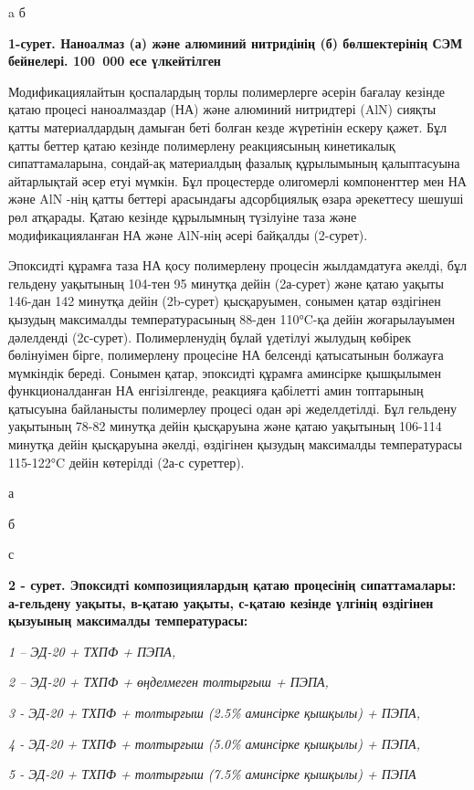 a б

{\bfseries 1-сурет. Наноалмаз (а) және алюминий нитридінің (б)
бөлшектерінің СЭМ бейнелері. 100~000 есе үлкейтілген}

Модификациялайтын қоспалардың торлы полимерлерге әсерін бағалау кезінде
қатаю процесі наноалмаздар (НА) және алюминий нитридтері (AlN) сияқты
қатты материалдардың дамыған беті болған кезде жүретінін ескеру қажет.
Бұл қатты беттер қатаю кезінде полимерлену реакциясының кинетикалық
сипаттамаларына, сондай-ақ материалдың фазалық құрылымының қалыптасуына
айтарлықтай әсер етуі мүмкін. Бұл процестерде олигомерлі компоненттер
мен НА және AlN -нің қатты беттері арасындағы адсорбциялық өзара
әрекеттесу шешуші рөл атқарады. Қатаю кезінде құрылымның түзілуіне таза
және модификацияланған НА және AlN-нің әсері байқалды (2-сурет).

Эпоксидті құрамға таза НА қосу полимерлену процесін жылдамдатуға әкелді,
бұл гельдену уақытының 104-тен 95 минутқа дейін (2а-сурет) және қатаю
уақыты 146-дан 142 минутқа дейін (2b-сурет) қысқаруымен, сонымен қатар
өздігінен қызудың максималды температурасының 88-ден 110°C-қа дейін
жоғарылауымен дәлелденді (2с-сурет). Полимерленудің бұлай үдетілуі
жылудың көбірек бөлінуімен бірге, полимерлену процесіне НА белсенді
қатысатынын болжауға мүмкіндік береді. Сонымен қатар, эпоксидті құрамға
аминсірке қышқылымен функционалданған НА енгізілгенде, реакцияға
қабілетті амин топтарының қатысуына байланысты полимерлеу процесі одан
әрі жеделдетілді. Бұл гельдену уақытының 78-82 минутқа дейін қысқаруына
және қатаю уақытының 106-114 минутқа дейін қысқаруына әкелді, өздігінен
қызудың максималды температурасы 115-122°C дейін көтерілді (2а-с
суреттер).

а

б

с

{\bfseries 2 - сурет. Эпоксидті композициялардың қатаю процесінің
сипаттамалары: а-гельдену уақыты, в-қатаю уақыты, с-қатаю кезінде
үлгінің өздігінен қызуының максималды температурасы:}

\emph{1 -- ЭД-20 + ТХПФ + ПЭПА,}

\emph{2 -- ЭД-20 + ТХПФ + өңделмеген толтырғыш + ПЭПА,}

\emph{3 - ЭД-20 + ТХПФ + толтырғыш (2.5\% аминсірке қышқылы) + ПЭПА,}

\emph{4 - ЭД-20 + ТХПФ + толтырғыш (5.0\% аминсірке қышқылы) + ПЭПА,}

\emph{5 - ЭД-20 + ТХПФ + толтырғыш (7.5\% аминсірке қышқылы) + ПЭПА}

